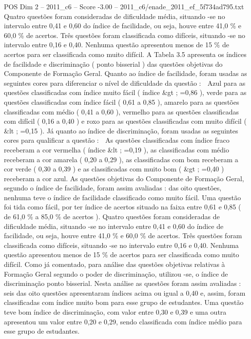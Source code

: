 \begin{textsample}{POS Dim 2 – 2011\_c6 – Score -3.00 – 2011\_c6/enade\_2011\_ef\_5f734ad795.txt}
Quatro questões foram consideradas de dificuldade média, situando -se no intervalo entre 0,41 e 0,60 do índice de facilidade, ou seja, houve entre 41,0 \% e 60,0 \% de acertos.
Três questões foram classificada como difíceis, situando -se no intervalo entre 0,16 e 0,40.
Nenhuma questão apresentou menos de 15 \% de acertos para ser classificada como muito difícil.
A Tabela 3.5 apresenta os índices de facilidade e discriminação ( ponto bisserial ) das questões objetivas do Componente de Formação Geral.
Quanto ao índice de facilidade, foram usadas as seguintes cores para diferenciar o nível de dificuldade da questão :  Azul para as questões classificadas com índice muito fácil ( índice \&gt ; =0,86 ), verde para as questões classificadas com índice fácil ( 0,61 a 0,85 ), amarelo para as questões classificadas com médio ( 0,41 a 0,60 ), vermelho para as questões classificadas com difícil ( 0,16 a 0,40 ) e roxo para as questões classificadas com muito difícil ( \&lt ; =0,15 ).
Já quanto ao índice de discriminação, foram usadas as seguintes cores para qualificar a questão :  As questões classificadas com índice fraco receberam a cor vermelha ( índice \&lt ; =0,19 ), as classificadas com médio receberam a cor amarela ( 0,20 a 0,29 ), as classificadas com bom receberam a cor verde ( 0,30 a 0,39 ) e as classificadas com muito bom ( \&gt ; =0,40 ) receberam a cor azul.
As questões objetivas do Componente de Formação Geral, segundo o índice de facilidade, foram assim avaliadas : das oito questões, nenhuma teve o índice de facilidade classificado como muito fácil.
Uma questão foi tida como fácil, por ter índice de acertos situado na faixa entre 0,61 e 0,85 ( de 61,0 \% a 85,0 \% de acertos ).
Quatro questões foram consideradas de dificuldade média, situando -se no intervalo entre 0,41 e 0,60 do índice de facilidade, ou seja, houve entre 41,0 \% e 60,0 \% de acertos.
Três questões foram classificada como difíceis, situando -se no intervalo entre 0,16 e 0,40.
Nenhuma questão apresentou menos de 15 \% de acertos para ser classificada como muito difícil.
Como já comentado, para análise das questões objetivas relativas à Formação Geral segundo o poder de discriminação, utilizou -se, o índice de discriminação ponto bisserial.
Nesta análise as questões foram assim avaliadas : seis das oito questões apresentaram índices acima ou igual a 0,40 e, assim, foram classificadas com índice muito bom para esse grupo de estudantes.
Uma questão teve bom índice de discriminação, com valor entre 0,30 e 0,39 e uma outra apresentou um valor entre 0,20 e 0,29, sendo classificada com índice médio para esse grupo de estudantes.

\end{textsample}

